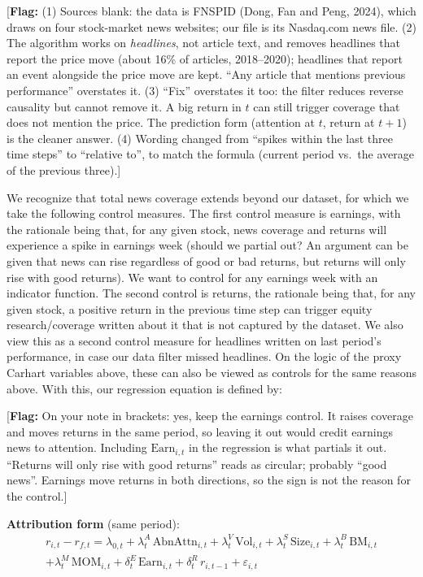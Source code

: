 \documentclass[11pt]{article}
\newcommand{\flag}[1]{{\color{red!75!black}\small [\textbf{Flag:} #1]}}
\begin{document}
\flag{(1) Sources blank: the data is FNSPID (Dong, Fan and Peng, 2024), which draws on four stock-market news websites; our file is its Nasdaq.com news file. (2) The algorithm works on \emph{headlines}, not article text, and removes headlines that report the price move (about 16\% of articles, 2018--2020); headlines that report an event alongside the price move are kept. ``Any article that mentions previous performance'' overstates it. (3) ``Fix'' overstates it too: the filter reduces reverse causality but cannot remove it. A big return in $t$ can still trigger coverage that does not mention the price. The prediction form (attention at $t$, return at $t+1$) is the cleaner answer. (4) Wording changed from ``spikes within the last three time steps'' to ``relative to'', to match the formula (current period vs.\ the average of the previous three).}

We recognize that total news coverage extends beyond our dataset, for which we take the following control measures. The first control measure is earnings, with the rationale being that, for any given stock, news coverage and returns will experience a spike in earnings week (should we partial out? An argument can be given that news can rise regardless of good or bad returns, but returns will only rise with good returns). We want to control for any earnings week with an indicator function. The second control is returns, the rationale being that, for any given stock, a positive return in the previous time step can trigger equity research/coverage written about it that is not captured by the dataset. We also view this as a second control measure for headlines written on last period's performance, in case our data filter missed headlines. On the logic of the proxy Carhart variables above, these can also be viewed as controls for the same reasons above. With this, our regression equation is defined by:

\flag{On your note in brackets: yes, keep the earnings control. It raises coverage and moves returns in the same period, so leaving it out would credit earnings news to attention. Including $\text{Earn}_{i,t}$ in the regression is what partials it out. ``Returns will only rise with good returns'' reads as circular; probably ``good news''. Earnings move returns in both directions, so the sign is not the reason for the control.}

\textbf{Attribution form} (same period):
\begin{multline}
r_{i,t} - r_{f,t} = \lambda_{0,t} + \lambda^{A}_{t}\,\text{AbnAttn}_{i,t} + \lambda^{V}_{t}\,\text{Vol}_{i,t} + \lambda^{S}_{t}\,\text{Size}_{i,t} + \lambda^{B}_{t}\,\text{BM}_{i,t} \\
 + \lambda^{M}_{t}\,\text{MOM}_{i,t} + \delta^{E}_{t}\,\text{Earn}_{i,t} + \delta^{R}_{t}\,r_{i,t-1} + \varepsilon_{i,t}
\end{multline}
\end{document}
